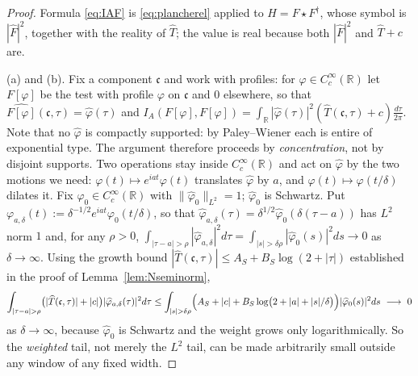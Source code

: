 \documentclass[11pt]{amsart}
\theoremstyle{definition}
\theoremstyle{remark}
\newcommand{\R}{\mathbb R}
\newcommand{\Th}{\widehat{T}}
\begin{document}
\begin{proof}
Formula \eqref{eq:IAF} is \eqref{eq:plancherel} applied to $H=F\star
F^{\dagger}$, whose symbol is $|\widehat F|^{2}$, together with the reality of
$\Th$; the value is real because both $|\widehat F|^{2}$ and $\Th+c$ are.

(a) and (b).  Fix a component $\mathfrak c$ and work with profiles: for
$\varphi\in C_c^{\infty}(\R)$ let $F[\varphi]$ be the test with profile
$\varphi$ on $\mathfrak c$ and $0$ elsewhere, so that
$\widehat{F[\varphi]}(\mathfrak c,\tau)=\widehat\varphi(\tau)$ and
$I_A(F[\varphi],F[\varphi])=\int_{\R}|\widehat\varphi(\tau)|^{2}
(\Th(\mathfrak c,\tau)+c)\frac{d\tau}{2\pi}$.  Note that no $\widehat\varphi$
is compactly supported: by Paley--Wiener each is entire of exponential type.
The argument therefore proceeds by \emph{concentration}, not by disjoint
supports.  Two operations stay inside $C_c^{\infty}(\R)$ and act on
$\widehat\varphi$ by the two motions we need: $\varphi(t)\mapsto
e^{iat}\varphi(t)$ translates $\widehat\varphi$ by $a$, and
$\varphi(t)\mapsto\varphi(t/\delta)$ dilates it.  Fix $\varphi_0\in
C_c^{\infty}(\R)$ with $\lVert\widehat\varphi_0\rVert_{L^{2}}=1$;
$\widehat\varphi_0$ is Schwartz.  Put
$\varphi_{a,\delta}(t):=\delta^{-1/2}e^{iat}\varphi_0(t/\delta)$, so that
$\widehat\varphi_{a,\delta}(\tau)=\delta^{1/2}\widehat\varphi_0(\delta(\tau-a))$
has $L^{2}$ norm $1$ and, for any $\rho>0$,
$\int_{|\tau-a|>\rho}|\widehat\varphi_{a,\delta}|^{2}d\tau=
\int_{|s|>\delta\rho}|\widehat\varphi_0(s)|^{2}ds\to0$ as $\delta\to\infty$.
Using the growth bound $|\Th(\mathfrak c,\tau)|\le A_S+B_S\log(2+|\tau|)$
established in the proof of Lemma~\ref{lem:Nseminorm},
\begin{equation}\label{eq:weightedtail}
\int_{|\tau-a|>\rho}\bigl(|\Th(\mathfrak c,\tau)|+|c|\bigr)
|\widehat\varphi_{a,\delta}(\tau)|^{2}d\tau
\le\int_{|s|>\delta\rho}\Bigl(A_S+|c|+B_S\log\bigl(2+|a|+|s|/\delta\bigr)\Bigr)
|\widehat\varphi_0(s)|^{2}ds\ \longrightarrow\ 0
\end{equation}
as $\delta\to\infty$, because $\widehat\varphi_0$ is Schwartz and the weight
grows only logarithmically.  So the \emph{weighted} tail, not merely the
$L^{2}$ tail, can be made arbitrarily small outside any window of any fixed
width.


\end{proof}
\end{document}
